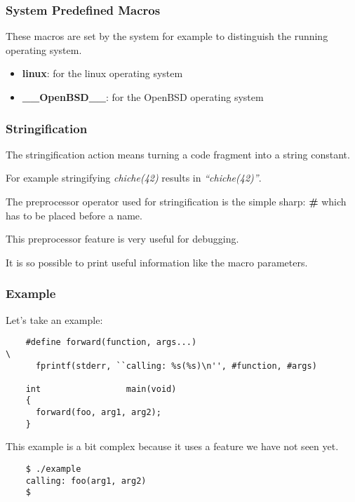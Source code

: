 
\begin{frame}
  \frametitle{System Predefined Macros}

  These macros are set by the system for example to distinguish the
  running operating system.

  \begin{itemize}[<+->]
    \item
      \textbf{linux}: for the linux operating system
    \item
      \textbf{\_\_OpenBSD\_\_}: for the OpenBSD operating system
  \end{itemize}
\end{frame}


\begin{frame}
  \frametitle{Stringification}

  The stringification action means turning a code fragment into
  a string constant.

  \nl

  For example stringifying \textit{chiche(42)} results in
  \textit{``chiche(42)''}.

  \nl

  The preprocessor operator used for stringification is the simple sharp:
  \textbf{\#} which has to be placed before a name.

  \nl

  This preprocessor feature is very useful for debugging.

  \nl

  It is so possible to print useful information like the macro parameters.
\end{frame}


\begin{frame}[containsverbatim]
  \frametitle{Example}

  Let's take an example:

  \begin{verbatim}
    #define forward(function, args...)                                  \
      fprintf(stderr, ``calling: %s(%s)\n'', #function, #args)

    int                 main(void)
    {
      forward(foo, arg1, arg2);
    }
  \end{verbatim}

  This example is a bit complex because it uses a feature we have not seen
  yet.

  \begin{verbatim}
    $ ./example
    calling: foo(arg1, arg2)
    $ 
  \end{verbatim}
\end{frame}

